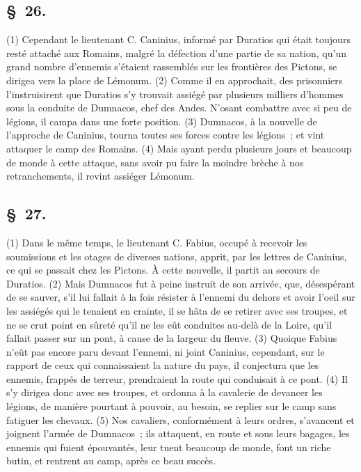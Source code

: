 \documentclass[french,twoside]{book} %
\begin{document}
\subsection[{§ 26.}]{ \textsc{§ 26.} }
\noindent (1) Cependant le lieutenant C. Caninius, informé par Duratios qui était toujours resté attaché aux Romains, malgré la défection d’une partie de sa nation, qu’un grand nombre d’ennemis s’étaient rassemblés sur les frontières des Pictons, se dirigea vers la place de Lémonum. (2) Comme il en approchait, des prisonniers l’instruisirent que Duratios s’y trouvait assiégé par plusieurs milliers d’hommes sous la conduite de Dumnacos, chef des Andes. N'osant combattre avec si peu de légions, il campa dans une forte position. (3) Dumnacos, à la nouvelle de l’approche de Caninius, tourna toutes ses forces contre les légions ; et vint attaquer le camp des Romains. (4) Mais ayant perdu plusieurs jours et beaucoup de monde à cette attaque, sans avoir pu faire la moindre brèche à nos retranchements, il revint assiéger Lémonum.
\subsection[{§ 27.}]{ \textsc{§ 27.} }
\noindent (1) Dans le même temps, le lieutenant C. Fabius, occupé à recevoir les soumissions et les otages de diverses nations, apprit, par les lettres de Caninius, ce qui se passait chez les Pictons. À cette nouvelle, il partit au secours de Duratios. (2) Mais Dumnacos fut à peine instruit de son arrivée, que, désespérant de se sauver, s’il lui fallait à la fois résister à l’ennemi du dehors et avoir l’oeil sur les assiégés qui le tenaient en crainte, il se hâta de se retirer avec ses troupes, et ne se crut point en sûreté qu’il ne les eût conduites au-delà de la Loire, qu’il fallait passer sur un pont, à cause de la largeur du fleuve. (3) Quoique Fabius n’eût pas encore paru devant l’ennemi, ni joint Caninius, cependant, sur le rapport de ceux qui connaissaient la nature du pays, il conjectura que les ennemis, frappés de terreur, prendraient la route qui conduisait à ce pont. (4) Il s’y dirigea donc avec ses troupes, et ordonna à la cavalerie de devancer les légions, de manière pourtant à pouvoir, au besoin, se replier sur le camp sans fatiguer les chevaux. (5) Nos cavaliers, conformément à leurs ordres, s’avancent et joignent l’armée de Dumnacos ; ils attaquent, en route et sous leurs bagages, les ennemis qui fuient épouvantés, leur tuent beaucoup de monde, font un riche butin, et rentrent au camp, après ce beau succès.
\end{document}
